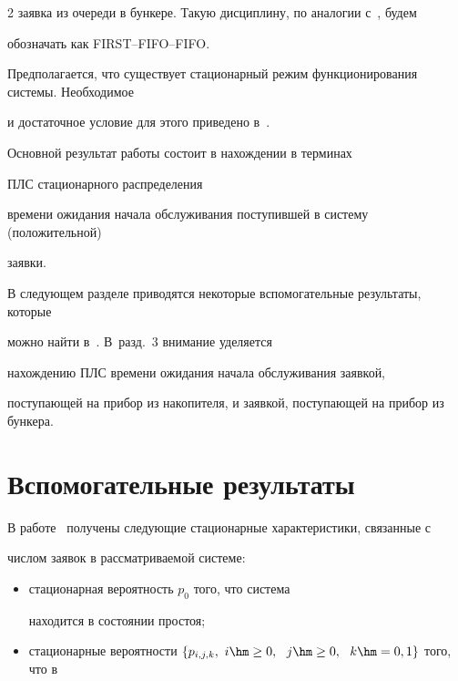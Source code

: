 \begin{multicols}{2}
заявка из очереди в бункере. Такую дисциплину, по аналогии с~\cite{6}, будем


обозначать как FIRST--FIFO--FIFO.





Предполагается, что существует стационарный режим функционирования системы. Необходимое


и достаточное условие для этого приведено в~\cite{8}.





Основной результат работы состоит в нахождении в терминах


ПЛС стационарного распределения


времени ожидания начала обслуживания поступившей в сис\-те\-му (положительной)


заявки.





В следующем разделе приводятся некоторые вспомогательные результаты, которые


можно найти в~\cite{6, 8}. В~разд.~3 внимание уделяется


нахождению ПЛС времени ожидания начала обслуживания заявкой,


поступающей на прибор из накопителя, и заявкой, поступающей на прибор из бункера.








\section{Вспомогательные результаты}





В работе~\cite{8} получены следующие стационарные характеристики, связанные с


числом заявок в рассматриваемой системе:


\begin{itemize}


\item стационарная вероятность $p_0$ того, что система


находится в состоянии простоя;


\item


стационарные вероятности $\{p_{i,j,k},  \ i \hm\ge 0, \ \ j \hm\ge 0, \ \ k\hm=0,1 \}$ того, что в



\end{itemize}
\end{multicols}
